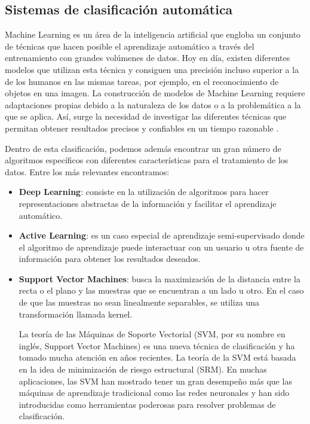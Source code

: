 \subsection{Sistemas de clasificación automática}
Machine Learning es un área de la inteligencia artificial que engloba un conjunto de técnicas que hacen posible el aprendizaje automático a través del entrenamiento con grandes volúmenes de datos. Hoy en día, existen diferentes modelos que utilizan esta técnica y consiguen una precisión incluso superior a la de los humanos en las mismas tareas, por ejemplo, en el reconocimiento de objetos en una imagen. La construcción de modelos de Machine Learning requiere adaptaciones propias debido a la naturaleza de los datos o a la problemática a la que se aplica. Así, surge la necesidad de investigar las diferentes técnicas que permitan obtener resultados precisos y confiables en un tiempo razonable \cite{russo}.

Dentro de esta clasificación, podemos además encontrar un gran número de algoritmos específicos con diferentes características para el tratamiento de los datos. Entre los más relevantes encontramos:

\begin{itemize}
    \item \textbf{Deep Learning}: consiste en la utilización de algoritmos para hacer representaciones abstractas de la información y facilitar el aprendizaje automático.
    \item \textbf{Active Learning}: es un caso especial de aprendizaje semi-supervisado donde el algoritmo de aprendizaje puede interactuar con un usuario u otra fuente de información para obtener los resultados deseados.
    \item \textbf{Support Vector Machines}: busca la maximización de la distancia entre la recta o el plano y las muestras que se encuentran a un lado u otro. En el caso de que las muestras no sean linealmente separables, se utiliza una transformación llamada kernel.

    La teoría de las Máquinas de Soporte Vectorial (SVM, por su nombre en inglés, Support Vector Machines) es una nueva técnica de clasificación y ha tomado mucha atención en años recientes. La teoría de la SVM está basada en la idea de minimización de riesgo estructural (SRM). En muchas aplicaciones, las SVM han mostrado tener un gran desempeño más que las máquinas de aprendizaje tradicional como las redes neuronales y han sido introducidas como herramientas poderosas para resolver problemas de clasificación.
\end{itemize}

